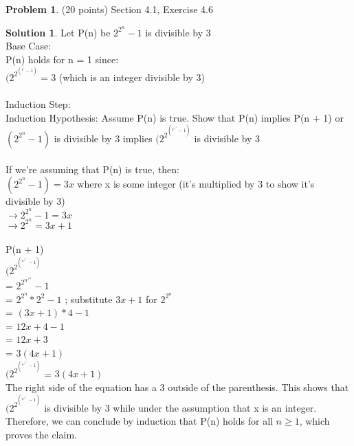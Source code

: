 \documentclass{article}
\theoremstyle{definition}
\newtheorem{problem}{Problem}
\newtheorem*{solution}{Solution}
\begin{document}
\begin{problem} (20 points) Section 4.1, Exercise 4.6
\end{problem}
\begin{solution} 
Let P(n) be $2^2^n - 1$ is divisible by 3 \\
Base Case: \\
P(n) holds for n = 1 since: \\
$(2^2^(^1^) - 1) = 3$ (which is an integer divisible by 3) \\
\\
Induction Step: \\
Induction Hypothesis: Assume P(n) is true. Show that P(n) implies P(n + 1) or $(2^2^n - 1)$ is divisible by 3 implies $(2^2^(^n^+^1^) - 1)$ is divisible by 3\\
\\
If we're assuming that P(n) is true, then: \\
$(2^2^n - 1) = 3x$ where x is some integer (it's multiplied by 3 to show it's divisible by 3)\\
$\to 2^2^n - 1= 3x$ \\
$\to 2^2^n = 3x + 1$ \\
\\
P(n + 1) \\
$(2^2^(^n^+^1^) - 1)$ \\
= $2^2^n^+^2 - 1$ \\
= $2^2^n * 2^2 - 1$ ; substitute $3x + 1$ for $2^2^n$\\
= $(3x + 1) * 4 - 1$\\
= $12x + 4 - 1$ \\
= $12x + 3$ \\
= $3(4x + 1)$ \\
$(2^2^(^n^+^1^) - 1)$ = $3(4x + 1)$ \\
The right side of the equation has a 3 outside of the parenthesis. This shows that $(2^2^(^n^+^1^) - 1)$ is divisible by 3 while under the assumption that x is an integer.
Therefore, we can conclude by induction that P(n) holds for all $n \geqslant 1$, which proves the claim.
\end{solution}
\end{document}
